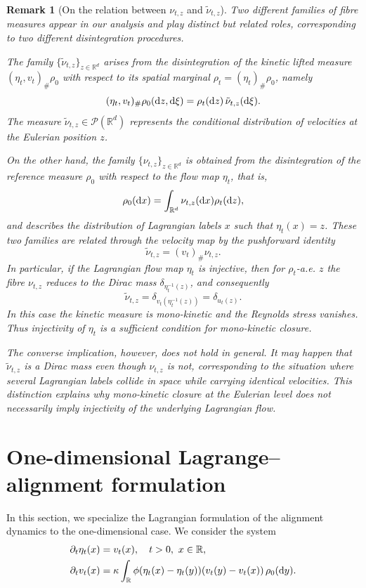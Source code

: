 \documentclass[10pt,reqno]{amsart}
\numberwithin{equation}{section}
\newtheorem{remark}{Remark}[section]
\newcommand{\R}{\mathbb R}
\newcommand{\pa}{\partial}
\newcommand{\intr}{\int_{\R^d}}
\newcommand{\calP}{\mathcal P}
\newcommand{\rd}{\textnormal{d}}
\newcommand{\dx}{\textnormal{d}x}
\newcommand{\dy}{\textnormal{d}y}
\newcommand{\dz}{\textnormal{d}z}
\begin{document}
 \begin{remark}[On the relation between $\nu_{t,z}$ and $\tilde\nu_{t,z}$]
Two different families of fibre measures appear in our analysis and play distinct but related roles, corresponding to two different disintegration
procedures.

The family $\{\tilde\nu_{t,z}\}_{z\in\R^d}$ arises from the disintegration of the kinetic lifted measure $(\eta_t,v_t)_\#\rho_0$ with respect to its spatial marginal $\rho_t=(\eta_t)_\#\rho_0$, namely
\[
(\eta_t,v_t)_\#\rho_0(\dz,\rd\xi)=\rho_t(\dz)\,\tilde\nu_{t,z}(\rd\xi).
\]
The measure $\tilde\nu_{t,z}\in\calP(\R^d)$ represents the conditional distribution of velocities at the Eulerian position $z$.

On the other hand, the family $\{\nu_{t,z}\}_{z\in\R^d}$ is obtained from the disintegration of the reference measure $\rho_0$ with respect to the flow map $\eta_t$, that is,
\[
\rho_0(\dx)=\intr\nu_{t,z}(\dx) \rho_t(\dz),
\]
and describes the distribution of Lagrangian labels $x$ such that $\eta_t(x)=z$. These two families are related through the velocity map by the pushforward identity
\[
\tilde\nu_{t,z} = (v_t)_\# \nu_{t,z}.
\]
In particular, if the Lagrangian flow map $\eta_t$ is injective, then for $\rho_t$-a.e.  $z$ the fibre $\nu_{t,z}$ reduces to the Dirac mass $\delta_{\eta_t^{-1}(z)}$, and consequently
\[
\tilde\nu_{t,z}=\delta_{v_t(\eta_t^{-1}(z))}=\delta_{u_t(z)}.
\]
In this case the kinetic measure is mono-kinetic and the Reynolds stress vanishes. Thus injectivity of $\eta_t$ is a sufficient condition for mono-kinetic closure.

The converse implication, however, does not hold in general. It may happen that $\tilde\nu_{t,z}$ is a Dirac mass even though $\nu_{t,z}$ is not, corresponding to the situation where several Lagrangian labels collide in space while carrying identical velocities. This distinction explains why mono-kinetic closure at the Eulerian level does not necessarily imply injectivity of the underlying Lagrangian flow.
\end{remark}

 

 

\section{One-dimensional Lagrange--alignment formulation}\label{sec:1DEA}
In this section, we specialize the Lagrangian formulation of the alignment dynamics to the one-dimensional case. We consider the system
\begin{align}\label{Lag_1}
\begin{aligned}
\pa_t \eta_t(x) &= v_t(x), \quad t >0, \ x \in \R, \\
\pa_t v_t(x) &= \kappa \int_\R \phi (\eta_t(x)-\eta_t(y))(v_t(y)-v_t(x))\,\rho_0(\dy).
\end{aligned}
\end{align}
\end{document}
